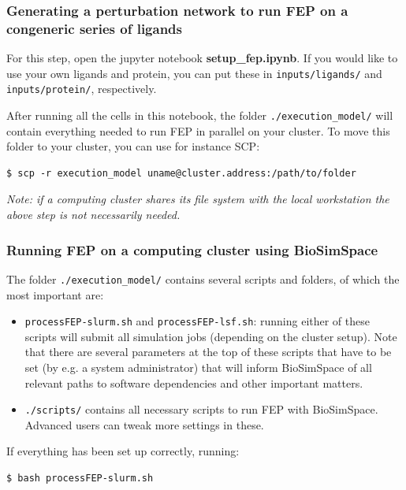 \subsubsection{Generating a perturbation network to run FEP on a congeneric series of ligands}

For this step, open the jupyter notebook \textbf{setup\_fep.ipynb}. If
you would like to use your own ligands and protein, you can put these in
\texttt{inputs/ligands/} and \texttt{inputs/protein/}, respectively.

After running all the cells in this notebook, the folder
\texttt{./execution\_model/} will contain everything needed to run FEP
in parallel on your cluster. To move this folder to your cluster, you
can use for instance SCP:

\begin{lstlisting}
$ scp -r execution_model uname@cluster.address:/path/to/folder
\end{lstlisting}

\noindent \emph{Note: if a computing cluster shares its file system with the local workstation the above step is not necessarily needed.}


\subsubsection{Running FEP on a computing cluster using
BioSimSpace}

The folder \texttt{./execution\_model/} contains several scripts and
folders, of which the most important are:

\begin{itemize}
\item
  \texttt{processFEP-slurm.sh} and \texttt{processFEP-lsf.sh}: running
  either of these scripts will submit all simulation jobs (depending on the
  cluster setup). Note that there are several parameters at the top of
  these scripts that have to be set (by e.g. a system administrator)
  that will inform BioSimSpace of all relevant paths to software
  dependencies and other important matters.
\item
  \texttt{./scripts/} contains all necessary scripts to run FEP with
  BioSimSpace. Advanced users can tweak more settings in these.
\end{itemize}

If everything has been set up correctly, running:

\begin{lstlisting}
$ bash processFEP-slurm.sh
\end{lstlisting}


